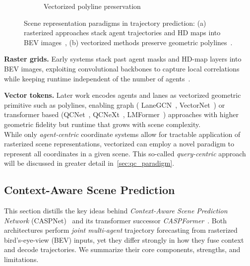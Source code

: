 \begin{figure}[H]
\begin{subfigure}[t]{0.37\textwidth}
    \caption{Vectorized polyline preservation}
    \label{fig:vectorized}
\end{subfigure}
\caption{Scene representation paradigms in trajectory prediction: (a) rasterized approaches stack agent trajectories and HD maps into BEV images~\cite{caspnetSchäfer2022}, (b) vectorized methods preserve geometric polylines~\cite{gao2020vectornet}.}
\label{fig:scene_representations}
\end{figure}

\textbf{Raster grids.} Early systems stack past agent masks and HD-map layers into BEV images, exploiting convolutional backbones to capture local correlations while keeping runtime independent of the number of agents~\cite{cui2019multimodal,chai2019multipath}.

\textbf{Vector tokens.} Later work encodes agents and lanes as vectorized geometric primitive such as polylines, enabling graph ( LaneGCN~\cite{liang2020learning}, VectorNet~\cite{gao2020vectornet}) or transformer based (QCNet~\cite{qcnetZhou2023}, QCNeXt~\cite{qcnextZhou2023}, LMFormer~\cite{lmformerYadav2025}) approaches with higher geometric fidelity but runtime that grows with scene complexity.\\
While only \emph{agent-centric} coordinate systems allow for tractable application of rasterized scene representations, vectorized can employ a novel paradigm to represent all coordinates in a given scene. This so-called \emph{query-centric} approach will be discussed in greater detail in~\autoref{sec:qc_paradigm}.


\subsection{Context-Aware Scene Prediction}
\label{ssec:caspnet}

This section distills the key ideas behind \emph{Context-Aware Scene Prediction Network} (CASPNet)~\cite{caspnetSchäfer2022} and its transformer successor \emph{CASPFormer}~\cite{caspformerYadav2024}. Both architectures perform \emph{joint multi-agent} trajectory forecasting from rasterized bird's-eye-view (BEV) inputs, yet they differ strongly in how they fuse context and decode trajectories. We summarize their core components, strengths, and limitations.

